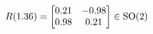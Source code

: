\documentclass[preview]{standalone}
\begin{document}
\begin{align*}
\special{dvisvgm:raw <g id='unique000'>}R(1.36) = \begin{bmatrix} 0.21 & -0.98 \\ 0.98 & 0.21 \end{bmatrix} \in \text{SO}(2)\special{dvisvgm:raw </g>}
\end{align*}
\end{document}
